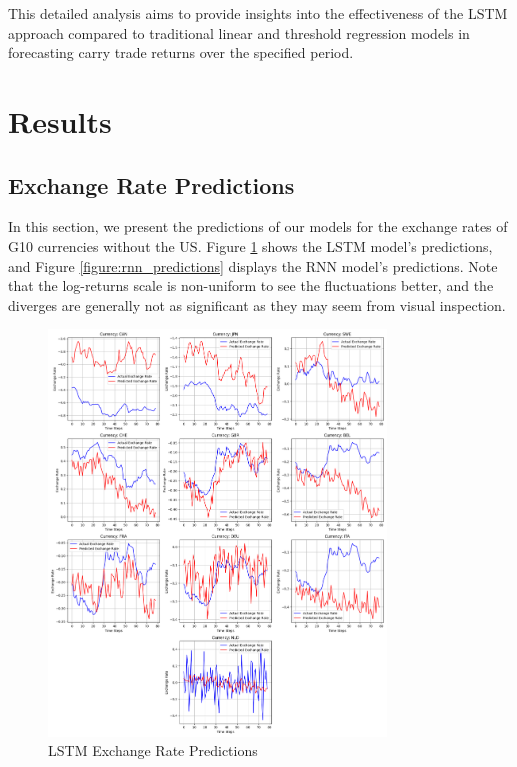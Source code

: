 \documentclass[a4paper,10pt]{article}
\begin{document}
This detailed analysis aims to provide insights into the effectiveness of the LSTM approach compared to traditional linear and threshold regression models in forecasting carry trade returns over the specified period.


\section{Results}

\subsection{Exchange Rate Predictions}

In this section, we present the predictions of our models for the exchange rates of G10 currencies without the US. Figure \ref{figure:lstm_predictions} shows the LSTM model's predictions, and Figure \ref{figure:rnn_predictions} displays the RNN model's predictions. Note that the log-returns scale is non-uniform to see the fluctuations better, and the diverges are generally not as significant as they may seem from visual inspection.

\begin{figure}[ht]
    \centering
    \includegraphics[width=0.8\textwidth]{figure/lstm_exchange_rate_predictions.png}
    \caption{LSTM Exchange Rate Predictions}
    \label{figure:lstm_predictions}
\end{figure}
\end{document}
